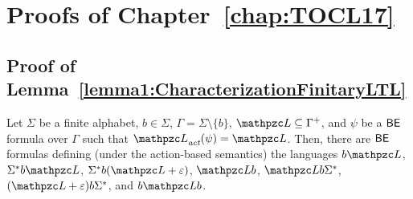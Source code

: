 \chapter{Proofs of Chapter~\ref{chap:TOCL17}}
\minitoc\mtcskip

\section{Proof of Lemma~\ref{lemma1:CharacterizationFinitaryLTL}}\label{proof:lemma1:CharacterizationFinitaryLTL}

\begin{lemma*}[\ref{lemma1:CharacterizationFinitaryLTL}] Let $\Sigma$ be a finite alphabet,
  $b\in \Sigma$, $\Gamma=\Sigma\setminus\{b\}$, $\Lang\subseteq \Gamma^{+}$, and $\psi$ be a $\mathsf{BE}$ formula over $\Gamma$ such that $\Lang_\act(\psi)=\Lang$. Then,
  there are $\mathsf{BE}$ formulas defining (under the action-based semantics) the languages
   $b\Lang$, $\Sigma^* b\Lang$, $\Sigma^* b(\Lang+\varepsilon)$,
   $\Lang b$, $ \Lang b \Sigma^* $, $ (\Lang+\varepsilon) b \Sigma^* $, and $b \Lang b$.
  \end{lemma*}
  
